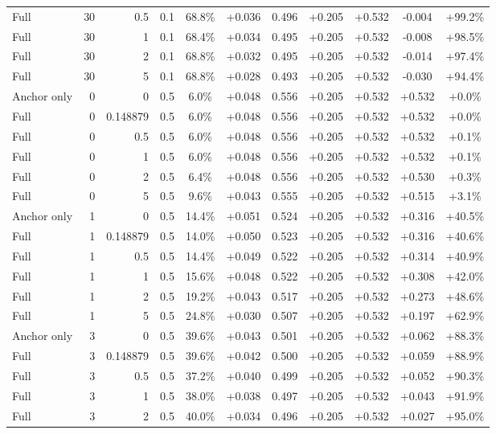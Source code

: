 \begin{table}[htbp]
\begin{tabular}{lrrrccccccc}
Full & 30 & 0.5 & 0.1 & 68.8\% & +0.036 & 0.496 & +0.205 & +0.532 & -0.004 & +99.2\% \\
Full & 30 & 1 & 0.1 & 68.4\% & +0.034 & 0.495 & +0.205 & +0.532 & -0.008 & +98.5\% \\
Full & 30 & 2 & 0.1 & 68.8\% & +0.032 & 0.495 & +0.205 & +0.532 & -0.014 & +97.4\% \\
Full & 30 & 5 & 0.1 & 68.8\% & +0.028 & 0.493 & +0.205 & +0.532 & -0.030 & +94.4\% \\
Anchor only & 0 & 0 & 0.5 & 6.0\% & +0.048 & 0.556 & +0.205 & +0.532 & +0.532 & +0.0\% \\
Full & 0 & 0.148879 & 0.5 & 6.0\% & +0.048 & 0.556 & +0.205 & +0.532 & +0.532 & +0.0\% \\
Full & 0 & 0.5 & 0.5 & 6.0\% & +0.048 & 0.556 & +0.205 & +0.532 & +0.532 & +0.1\% \\
Full & 0 & 1 & 0.5 & 6.0\% & +0.048 & 0.556 & +0.205 & +0.532 & +0.532 & +0.1\% \\
Full & 0 & 2 & 0.5 & 6.4\% & +0.048 & 0.556 & +0.205 & +0.532 & +0.530 & +0.3\% \\
Full & 0 & 5 & 0.5 & 9.6\% & +0.043 & 0.555 & +0.205 & +0.532 & +0.515 & +3.1\% \\
Anchor only & 1 & 0 & 0.5 & 14.4\% & +0.051 & 0.524 & +0.205 & +0.532 & +0.316 & +40.5\% \\
Full & 1 & 0.148879 & 0.5 & 14.0\% & +0.050 & 0.523 & +0.205 & +0.532 & +0.316 & +40.6\% \\
Full & 1 & 0.5 & 0.5 & 14.4\% & +0.049 & 0.522 & +0.205 & +0.532 & +0.314 & +40.9\% \\
Full & 1 & 1 & 0.5 & 15.6\% & +0.048 & 0.522 & +0.205 & +0.532 & +0.308 & +42.0\% \\
Full & 1 & 2 & 0.5 & 19.2\% & +0.043 & 0.517 & +0.205 & +0.532 & +0.273 & +48.6\% \\
Full & 1 & 5 & 0.5 & 24.8\% & +0.030 & 0.507 & +0.205 & +0.532 & +0.197 & +62.9\% \\
Anchor only & 3 & 0 & 0.5 & 39.6\% & +0.043 & 0.501 & +0.205 & +0.532 & +0.062 & +88.3\% \\
Full & 3 & 0.148879 & 0.5 & 39.6\% & +0.042 & 0.500 & +0.205 & +0.532 & +0.059 & +88.9\% \\
Full & 3 & 0.5 & 0.5 & 37.2\% & +0.040 & 0.499 & +0.205 & +0.532 & +0.052 & +90.3\% \\
Full & 3 & 1 & 0.5 & 38.0\% & +0.038 & 0.497 & +0.205 & +0.532 & +0.043 & +91.9\% \\
Full & 3 & 2 & 0.5 & 40.0\% & +0.034 & 0.496 & +0.205 & +0.532 & +0.027 & +95.0\% \\

\end{tabular}
\end{table}
